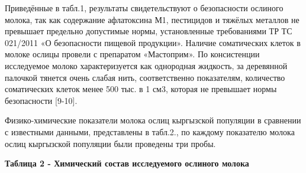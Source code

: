 Приведённые в табл.1, результаты свидетельствуют о безопасности ослиного
молока, так как содержание афлатоксина М1, пестицидов и тяжёлых металлов
не превышает предельно допустимые нормы, установленные требованиями ТР
ТС 021/2011 «О безопасности пищевой продукции». Наличие соматических
клеток в молоке ослицы провели с препаратом «Мастоприм». По консистенции
исследуемое молоко характеризуется как однородная жидкость, за
деревянной палочкой тянется очень слабая нить, соответственно
показателям, количество соматических клеток менее 500 тыс. в 1 см3,
которая не превышает нормы безопасности {[}9-10{]}.

Физико-химические показатели молока ослиц кыргызской популяции в
сравнении с известными данными, представлены в табл.2., по каждому
показателю молока ослиц кыргызской популяции были проведены три пробы.

{\bfseries Таблица 2 - Химический состав исследуемого ослиного молока}

